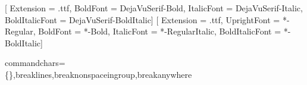 
%
  {\setmainfont{DejaVu Serif}}
  {\setmainfont{DejaVuSerif}[
     Extension      = .ttf,
     BoldFont       = DejaVuSerif-Bold,
     ItalicFont     = DejaVuSerif-Italic,
     BoldItalicFont = DejaVuSerif-BoldItalic]}
  {\setmonofont{Everson Mono}}
  {
     {\setmonofont{JuliaMono}}
     {\setmonofont{JuliaMono}[
        Extension      = .ttf,
        UprightFont    = *-Regular,
        BoldFont       = *-Bold,
        ItalicFont     = *-RegularItalic,
        BoldItalicFont = *-BoldItalic]}}


\usepackage{fvextra}
%
  {commandchars=\\\{\},breaklines,breaknonspaceingroup,breakanywhere}

